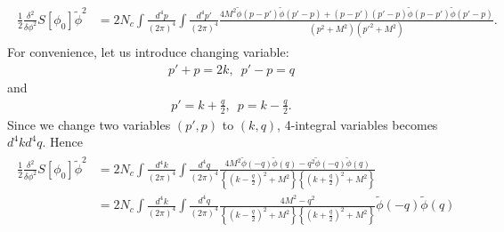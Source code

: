 \documentclass[tightenlines,floatfix,nofootinbib,superscriptaddress,fleqn]{revtex4-2}
\begin{document}
\begin{align}
  \begin{split}
    \frac{1}{2}\frac{\delta^2}{\delta\phi^2}S[\phi_0]\tilde{\phi}^2
    &=2N_c\int\frac{d^4p}{(2\pi)^4}\int\frac{d^4p'}{(2\pi)^4}
    \frac{4M^2\tilde{\phi}(p-p')
    \tilde{\phi}(p'-p)
  +(p-p')(p'-p)\tilde{\phi}(p-p')
   \tilde{\phi}(p'-p)}{(p^2+M^2)(p'^2+M^2)}.
  \end{split}
\end{align}
For convenience, let us introduce changing variable:
\begin{align}
  p'+p=2k,\,\,\,p'-p=q
\end{align}
and
\begin{align}
  p'=k+\frac{q}{2},\,\,\, p =k-\frac{q}{2}.
\end{align}
Since we change two variables $(p',p)$ to $(k,q)$, 4-integral variables becomes
$d^4kd^4q$. Hence 
\begin{align}
  \begin{split}
    \frac{1}{2}\frac{\delta^2}{\delta\phi^2}S[\phi_0]\tilde{\phi}^2
    &=2N_c\int\frac{d^4k}{(2\pi)^4}\int\frac{d^4q}{(2\pi)^4}
    \frac{4M^2\tilde{\phi}(-q)
    \tilde{\phi}(q)
  -q^2\tilde{\phi}(-q)
   \tilde{\phi}(q)}{\left\{\left(k-\frac{q}{2}\right)^2+M^2\right\}
   \left\{\left(k+\frac{q}{2}\right)^2+M^2\right\}} \\
   &=2N_c\int\frac{d^4k}{(2\pi)^4}\int\frac{d^4q}{(2\pi)^4}
    \frac{4M^2-q^2}{\left\{\left(k-\frac{q}{2}\right)^2+M^2\right\}
   \left\{\left(k+\frac{q}{2}\right)^2+M^2\right\}}\tilde{\phi}(-q)
   \tilde{\phi}(q)
  \end{split}
\end{align}
\end{document}
